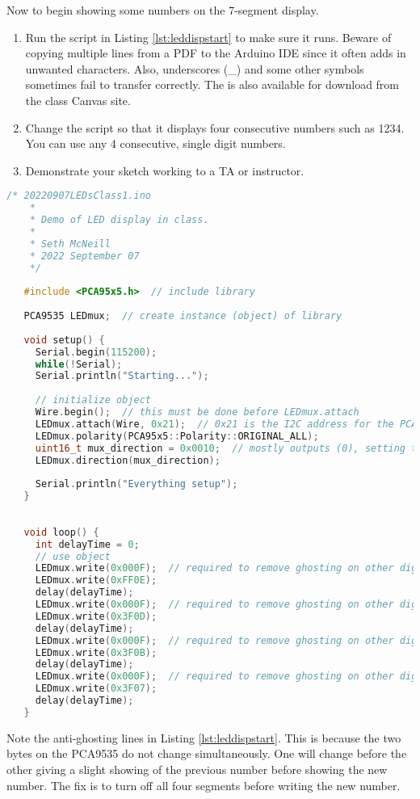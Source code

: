 Now to begin showing some numbers on the 7-segment display.

\begin{enumerate}
    \item Run the script in Listing \ref{lst:leddispstart} to make sure it runs. Beware of copying
            multiple lines from a PDF to the Arduino IDE since it often adds in unwanted characters. 
            Also, underscores (\_) and some other symbols sometimes fail to transfer correctly. The 
            is also available for download from the class Canvas site.
    \item Change the script so that it displays four consecutive numbers such as 1234. You can use
            any 4 consecutive, single digit numbers.
    \item Demonstrate your sketch working to a TA or instructor.
\end{enumerate}

\begin{lstlisting}[language=C++, caption={This listing is a starting point for driving the LED display. 
    This sketch may also be available on Canvas. Beware of copying out of PDFs since some characters
     (underscore for instance) come through garbled.},label={lst:leddispstart}]
    /* 20220907LEDsClass1.ino
    *  
    * Demo of LED display in class.
    * 
    * Seth McNeill
    * 2022 September 07
    */
   
   #include <PCA95x5.h>  // include library
   
   PCA9535 LEDmux;  // create instance (object) of library
   
   void setup() {
     Serial.begin(115200);
     while(!Serial);
     Serial.println("Starting...");
   
     // initialize object
     Wire.begin();  // this must be done before LEDmux.attach
     LEDmux.attach(Wire, 0x21);  // 0x21 is the I2C address for the PCA9535 attached to the LEDs
     LEDmux.polarity(PCA95x5::Polarity::ORIGINAL_ALL);
     uint16_t mux_direction = 0x0010;  // mostly outputs (0), setting to 1 designates input
     LEDmux.direction(mux_direction);
   
     Serial.println("Everything setup");
   }
   
   
   void loop() {
     int delayTime = 0;
     // use object
     LEDmux.write(0x000F);  // required to remove ghosting on other digits
     LEDmux.write(0xFF0E);
     delay(delayTime); 
     LEDmux.write(0x000F);  // required to remove ghosting on other digits
     LEDmux.write(0x3F0D);
     delay(delayTime); 
     LEDmux.write(0x000F);  // required to remove ghosting on other digits
     LEDmux.write(0x3F0B);
     delay(delayTime); 
     LEDmux.write(0x000F);  // required to remove ghosting on other digits
     LEDmux.write(0x3F07);
     delay(delayTime); 
   }
\end{lstlisting}
Note the anti-ghosting lines in Listing \ref{lst:leddispstart}. This is because the two
bytes on the PCA9535 do not change simultaneously. One will change before the other 
giving a slight showing of the previous number before showing the new number. The fix 
is to turn off all four segments before writing the new number.
    
